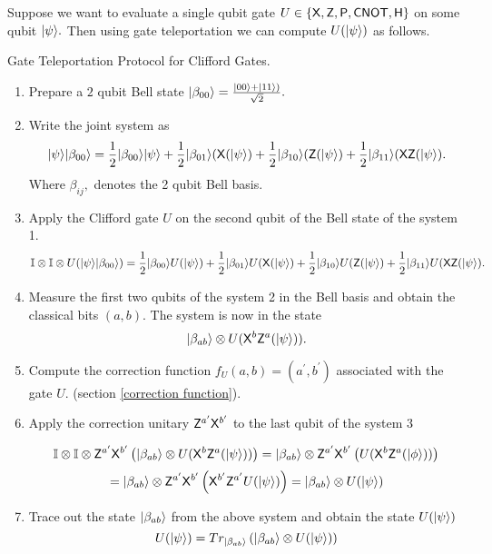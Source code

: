 Suppose we want to evaluate a single qubit gate $U\in\{{\sf X}, {\sf Z}, {\sf P}, {\sf CNOT},{\sf H}\}$ on some qubit ${\lvert}\psi\rangle.$ Then using gate teleportation  \cite{GC99} we can compute $U ({\lvert}\psi\rangle)$ as follows.
\begin{algorithm}[H]
\caption{Gate Teleportation Protocol for Clifford Gates.}
\begin{enumerate}
\item  Prepare a $2$ qubit Bell state ${\lvert}\beta_{00}\rangle=\frac{{\lvert}00\rangle+{\lvert}11\rangle)}{\sqrt{2}}.$
\item Write the joint system as
 \begin{equation}
{\lvert}\psi\rangle {\lvert}\beta_{00}\rangle=\frac{1}{2}{\lvert}\beta_{00}\rangle {\lvert}\psi\rangle+ \frac{1}{2}{\lvert}\beta_{01}\rangle( {\sf X}( {\lvert}\psi\rangle) + \frac{1}{2}{\lvert}\beta_{10}\rangle( {\sf Z}( {\lvert}\psi\rangle)+ \frac{1}{2}{\lvert}\beta_{11}\rangle( {\sf X} {\sf Z}( {\lvert}\psi\rangle).
\end{equation}
 Where $\beta_{ij},$  denotes the 2 qubit Bell basis.
\item Apply the Clifford gate $U$ on the second qubit of the Bell state of the system 1.
 \begin{equation}
\mathbb{I}\otimes \mathbb{I} \otimes U ({\lvert}\psi\rangle {\lvert}\beta_{00}\rangle)=\frac{1}{2}{\lvert}\beta_{00}\rangle U({\lvert}\psi\rangle)+ \frac{1}{2}{\lvert}\beta_{01}\rangle U( {\sf X}( {\lvert}\psi\rangle) + \frac{1}{2}{\lvert}\beta_{10}\rangle U( {\sf Z}( {\lvert}\psi\rangle)+ \frac{1}{2}{\lvert}\beta_{11}\rangle U( {\sf X} {\sf Z}( {\lvert}\psi\rangle).
 \end{equation}
 \item Measure the first two qubits of the system 2 in the Bell basis and obtain the classical bits $(a,b).$ The system is now in the state
 \begin{equation}
							{\lvert}\beta_{ab}\rangle\otimes U( {\sf X}^b {\sf Z}^a( {\lvert}\psi\rangle)).
\end{equation}
\item Compute the correction function $f_U(a,b)=(a^\prime,b^\prime)$ associated with the gate $U.$ (section \ref{correction function}).
\item Apply the correction unitary $ {\sf Z}^{a^\prime}  {\sf X}^{b^\prime}$ to the last qubit of the system 3

$$\mathbb{I}\otimes \mathbb{I}\otimes  {\sf Z}^{a^\prime}  {\sf X}^{b^\prime} \left({\lvert}\beta_{ab}\rangle\otimes U( {\sf X}^b {\sf Z}^a( {\lvert}\psi\rangle))\right)= {\lvert}\beta_{ab}\rangle\otimes  {\sf Z}^{a^\prime}  {\sf X}^{b^\prime}\left(U( {\sf X}^b {\sf Z}^a( {\lvert}\phi\rangle))\right)$$
$$= {\lvert}\beta_{ab}\rangle\otimes  {\sf Z}^{a^\prime}  {\sf X}^{b^\prime} \left({\sf X}^{b^\prime} {\sf Z}^{a^\prime} U( {\lvert}\psi\rangle)\right)={\lvert}\beta_{ab}\rangle\otimes U( {\lvert}\psi\rangle)$$
\item Trace out the state ${\lvert}\beta_{ab}\rangle$ from the above system and obtain the state $U( {\lvert}\psi\rangle)$
$$U( {\lvert}\psi\rangle)=Tr_{{\lvert}\beta_{ab}\rangle}\left( {\lvert}\beta_{ab}\rangle\otimes U({\lvert}\psi\rangle)\right)$$

\end{enumerate}	
\end{algorithm}	


